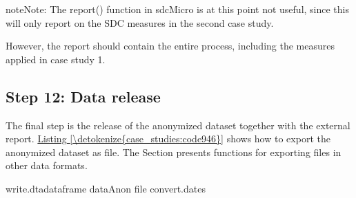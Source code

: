 \documentclass[letterpaper,10pt,english]{sphinxmanual}
\begin{document}
\begin{sphinxadmonition}{note}{Note:}
The report() function in sdcMicro is at this point not useful, since this will
only report on the SDC measures in the second case study.
\end{sphinxadmonition}

However, the report should contain the entire process, including the measures applied
in case study 1.


\subsection{Step 12: Data release}
\label{\detokenize{case_studies:id14}}
The final step is the release of the anonymized dataset together with
the external report. \hyperref[\detokenize{case_studies:code946}]{Listing \ref{\detokenize{case_studies:code946}}} shows how to export the anonymized
dataset as  file. The Section 
presents functions for exporting files in other data formats.

\def\sphinxLiteralBlockLabel{\label{\detokenize{case_studies:code946}}}
%
\begin{sphinxVerbatim}[commandchars=\\\{\},numbers=left,firstnumber=1,stepnumber=1]
write.dtadataframe  dataAnon file  convert.dates
\end{sphinxVerbatim}
\end{document}
